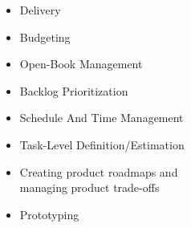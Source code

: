
  \begin{itemize}
    \setlength\itemsep{-0.3em}
    \item Delivery
    \item Budgeting
    \item Open-Book Management
    \item Backlog Prioritization
    \item Schedule And Time Management
    \item Task-Level Definition/Estimation
    \item Creating product roadmaps and \\ managing product trade-offs
    \item Prototyping
    \wt{
    }
    \wt{

    }
    \en{
% 
    } 
    \projectm{

    }
  \end{itemize}

  
